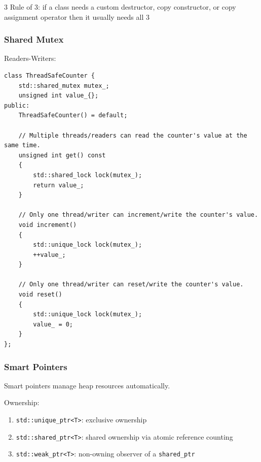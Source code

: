 \documentclass[12pt, a4paper]{article}
\begin{document}
\begin{multicols*}{3}
Rule of 3: if a class needs a custom destructor, copy constructor, or copy assignment operator then it usually needs all 3

\colbreak
\subsubsection{Shared Mutex}
Readers-Writers:
\begin{lstlisting}
class ThreadSafeCounter {
    std::shared_mutex mutex_;
    unsigned int value_{};
public:
    ThreadSafeCounter() = default;

    // Multiple threads/readers can read the counter's value at the same time.
    unsigned int get() const
    {
        std::shared_lock lock(mutex_);
        return value_;
    }

    // Only one thread/writer can increment/write the counter's value.
    void increment()
    {
        std::unique_lock lock(mutex_);
        ++value_;
    }

    // Only one thread/writer can reset/write the counter's value.
    void reset()
    {
        std::unique_lock lock(mutex_);
        value_ = 0;
    }
};
\end{lstlisting}

\colbreak
\subsubsection{Smart Pointers}

Smart pointers manage heap resources automatically.

Ownership:
\begin{enumerate}[\roman*.]
  \item \lstinline|std::unique_ptr<T>|: exclusive ownership
  \item \lstinline|std::shared_ptr<T>|: shared ownership via atomic reference counting
  \item \lstinline|std::weak_ptr<T>|: non-owning observer of a \lstinline|shared_ptr|
\end{enumerate}


\end{multicols*}
\end{document}
